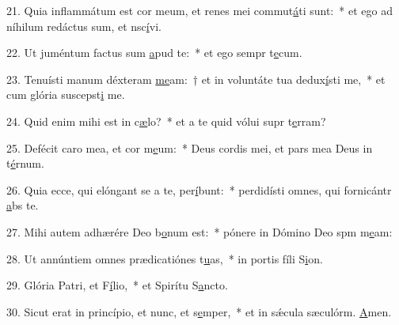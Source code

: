 21. Quia inflammátum est cor meum, et renes mei commut\uline{á}ti sunt:~* et ego ad níhilum redáctus sum, et nsc\uline{í}vi.\par 
22. Ut juméntum factus sum \uline{a}pud te:~* et ego sempr t\uline{e}cum.\par 
23. Tenuísti manum déxteram \uline{me}am:~† et in voluntáte tua dedux\uline{í}sti me,~* et cum glória suscepst\uline{i} me.\par 
24. Quid enim mihi est in c\uline{æ}lo?~* et a te quid vólui supr t\uline{e}rram?\par 
25. Defécit caro mea, et cor m\uline{e}um:~* Deus cordis mei, et pars mea Deus in t\uline{é}rnum.\par 
26. Quia ecce, qui elóngant se a te, per\uline{í}bunt:~* perdidísti omnes, qui fornicántr \uline{a}bs te.\par 
27. Mihi autem adhærére Deo b\uline{o}num est:~* pónere in Dómino Deo spm m\uline{e}am:\par 
28. Ut annúntiem omnes prædicatiónes t\uline{u}as,~* in portis fíli S\uline{i}on.\par 
29. Glória Patri, et F\uline{í}lio,~* et Spirítu S\uline{a}ncto.\par 
30. Sicut erat in princípio, et nunc, et s\uline{e}mper,~* et in sǽcula sæculórm. \uline{A}men.\par 
